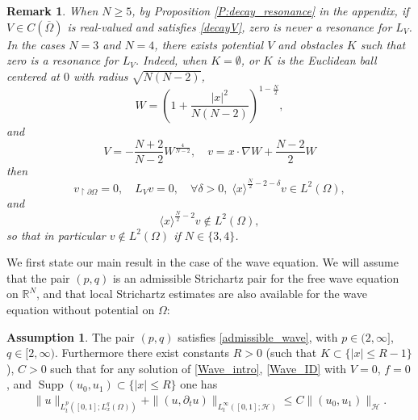 \documentclass[10pt,leqno]{amsart}
\newtheorem{remark}[theorem]{Remark}
\theoremstyle{definition}%
\newtheorem{assumption}{Assumption}
\theoremstyle{remark}
\numberwithin{equation}{section}
\newcommand{\R}{\mathbb{R}}
\newcommand{\supp}{\operatorname{Supp}}
\renewcommand{\^}{\widehat}%
\newcommand{\la}{\langle}
\newcommand{\ra}{\rangle}
\newcommand{\HHH}{\mathcal{H}}
\begin{document}
\begin{remark}
\label{R:example}
	When $N\ge 5$, by Proposition \ref{P:decay_resonance} in the appendix, if $V\in C(\overline{\Omega})$ is real-valued and satisfies \eqref{decayV}, zero is never a resonance for $L_V$. In the cases $N=3$ and $N=4$, there exists potential $V$ and obstacles $K$ such that zero is a resonance for $L_V$. Indeed, when $K=\emptyset$, or $K$ is the  Euclidean ball centered at $0$  with radius $\sqrt{N(N-2)}$, 
	$$W=\left( 1+\frac{|x|^2}{N(N-2)} \right)^{1-\frac{N}{2}},$$
	and 
	$$V=-\frac{N+2}{N-2} W^{\frac{4}{N-2}},\quad v=x\cdot \nabla W+\frac{N-2}{2}W$$
	then 
	$$v_{\restriction \partial\Omega}=0,\quad L_Vv=0,\quad \forall \delta >0, \;\la x\ra^{\frac{N}{2}-2-\delta}v\in L^2(\Omega),$$
	and
	$$\la x\ra^{\frac{N}{2}-2} v\notin L^2(\Omega),$$
	so that in particular $v\notin L^2(\Omega)$ if $N\in \{3,4\}$.
\end{remark}
We first state our main result in the case of the wave equation. We will assume that the pair $(p,q)$ is an admissible Strichartz pair for the free wave equation on $\R^N$, and that local Strichartz estimates are also available for the wave equation without potential on $\Omega$:
\begin{assumption}
\label{As:pqwave}
 The pair $(p,q)$ satisfies \eqref{admissible_wave}, with $p\in(2,\infty]$, $q\in [2,\infty)$. Furthermore there exist constants $R>0$ (such that $K\subset \{|x|\leq R-1\}$), $C>0$ such that for any solution of \eqref{Wave_intro}, \eqref{Wave_ID}  with $V=0$,  $f=0$, and $\supp(u_0,u_1)\subset \{|x|\leq R\}$ one has
		\begin{align*}
		\|u\|_{L^p_t([0,1]; L_x^q(\Omega))}+\|(u,\partial_t u)\|_{L^\infty_t([0,1];\HHH)}\le C\|(u_0,u_1)\|_{\HHH}.
		\end{align*}
\end{assumption}


\end{document}
